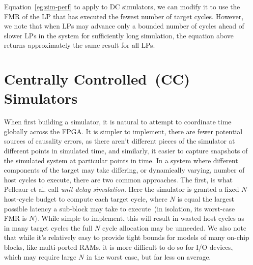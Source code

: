 Equation~\ref{eg:sim-perf} to apply to DC simulators, we can modify it to use
the FMR of the LP that has executed the fewest number of target cycles.
However, we note that when LPs may advance only a bounded number of cycles
ahead of slower LPs in the system for sufficiently long simulation, the
equation above returns approximately the same result for all LPs.

\section{Centrally Controlled~(CC) Simulators}

When first building a simulator, it is natural to attempt to coordinate time
globally across the FPGA. It is simpler to implement, there are fewer potential
sources of causality errors, as there aren't different pieces of the simulator at different points in simulated time,
and similarly, it easier to capture snapshots of the simulated system at particular points in
time. In a system where different components of the target may take differing,
or dynamically varying, number of host cycles to execute, there are two
common approaches.  The first, is what Pelleaur et al. call \emph{unit-delay
simulation}. Here the simulator is granted a fixed $N$-host-cycle budget to
compute each target cycle, where $N$ is equal the largest possible
latency a sub-block may take to execute~(in isolation, its worst-case FMR is $N$). While simple to
implement, this will result in wasted host cycles as in many target cycles the
full $N$ cycle allocation may be unneeded.  We also note that while it's
relatively easy to provide tight bounds for models of many on-chip
blocks, like multi-ported RAMs, it is more difficult to do so for I/O devices, which may require large $N$
in the worst case, but far less on average.

